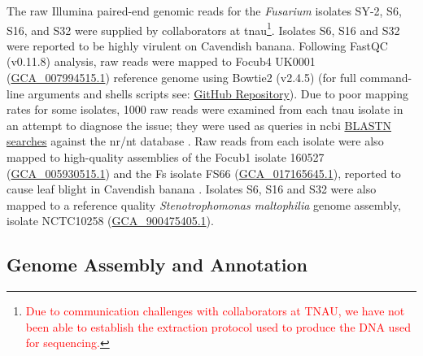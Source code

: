 The raw Illumina paired-end genomic reads for the \textit{Fusarium} isolates SY-2, S6, S16, and S32 were supplied by collaborators at \ac{tnau}\footnote{\textcolor{red}{Due to communication challenges with collaborators at TNAU, we have not been able to establish the extraction protocol used to produce the DNA used for sequencing.}}. Isolates S6, S16 and S32 were reported to be  highly virulent on Cavendish banana. Following FastQC (v0.11.8)
\parencite{Andrews2010} analysis, raw reads were mapped to \ac{Focub4} UK0001 (\href{https://www.ncbi.nlm.nih.gov/datasets/genome/GCA_007994515.1/}{GCA\_007994515.1}) \parencite{Warmington2019} reference genome using Bowtie2 (v2.4.5) \parencite{Langmead2012} (for full command-line arguments and shells scripts see: \href{https://github.com/JamiePike/NewTools-Project/blob/master/docs/Assembly/AssemblyNotes.md}{GitHub Repository}). Due to poor mapping rates for some isolates, 1000 raw reads were examined  from each \ac{tnau} isolate in an attempt to diagnose the issue; they were used as queries in  \ac{ncbi} \href{https://blast.ncbi.nlm.nih.gov/Blast.cgi?PROGRAM=blastn&BLAST_SPEC=GeoBlast&PAGE_TYPE=BlastSearch}{BLASTN searches} against the nr/nt database \parencite{Nih2014}. Raw reads from each isolate were also mapped to high-quality assemblies of the \ac{Focub1} isolate 160527 (\href{https://www.ncbi.nlm.nih.gov/datasets/genome/GCA_005930515.1/}{GCA\_005930515.1}) \parencite{Asai2019} and the \ac{Fs} isolate FS66 (\href{https://www.ncbi.nlm.nih.gov/datasets/genome/GCA_017165645.1/}{GCA\_017165645.1}), reported to cause leaf blight in Cavendish banana \parencite{Cui2021}. Isolates S6, S16 and S32 were also mapped to a reference quality \textit{Stenotrophomonas maltophilia} genome assembly, isolate NCTC10258 (\href{https://www.ncbi.nlm.nih.gov/datasets/genome/GCF_900475405.1/}{GCA\_900475405.1}). 

\subsection{Genome Assembly and Annotation}

